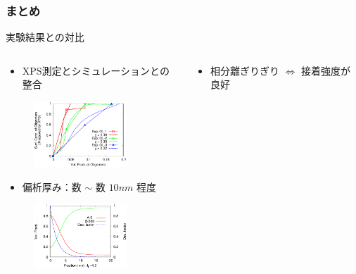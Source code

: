 \documentclass[12pt, dvipdfmx]{beamer}
\begin{document}
\begin{frame}\frametitle{まとめ}

\begin{center}
\color{red}実験結果との対比\color{black}
\end{center}

\begin{columns}
	\begin{column}{6.0cm}
	\vspace{-1\baselineskip}
	{\scriptsize
		\begin{itemize}
			\item XPS測定とシミュレーションとの整合
		\end{itemize}
	\vspace{-1\baselineskip}
		\begin{figure}[htbp]
			\begin{center}
				\includegraphics[width=35mm]{XPS_sin_45.eps}
			\end{center}
		\end{figure}

	\vspace{-1\baselineskip}
		\begin{itemize}
			\item 偏析厚み：数 $\sim$ 数 $10 nm$ 程度
		\end{itemize}
		
	\vspace{-1\baselineskip}
		\begin{figure}[htbp]
			\begin{center}
				\includegraphics[width=35mm]{A6_B600_Chi_03_chiS_0.0_totalA_0.04.eps}
			\end{center}
		\end{figure}
	}
	\end{column}

	\begin{column}{6.0cm}
	\vspace{-1\baselineskip}
	{\scriptsize
		\begin{itemize}
			\item 相分離ぎりぎり $\Leftrightarrow$ 接着強度が良好
		\end{itemize}
		
}
\end{column}
\end{columns}
\end{frame}
\end{document}
